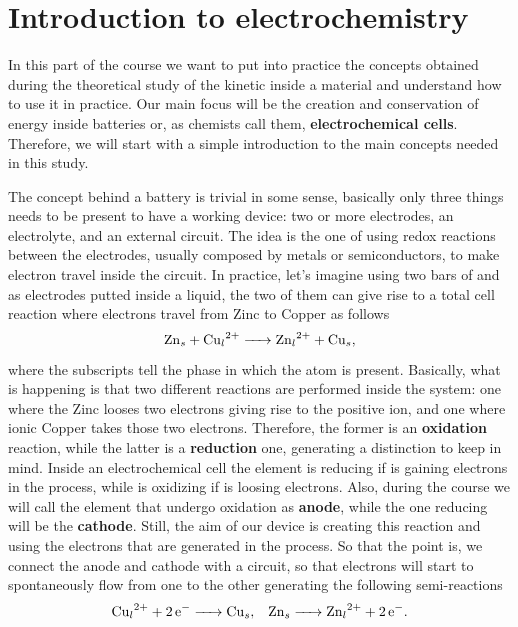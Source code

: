 \section{Introduction to electrochemistry}

In this part of the course we want to put into practice the concepts obtained during the theoretical study of the kinetic inside a material and understand how to use it in practice. Our main focus will be the creation and conservation of energy inside batteries or, as chemists call them, \textbf{electrochemical cells}. Therefore, we will start with a simple introduction to the main concepts needed in this study.

The concept behind a battery is trivial in some sense, basically only three things needs to be present to have a working device: two or more electrodes, an electrolyte, and an external circuit. The idea is the one of using redox reactions between the electrodes, usually composed by metals or semiconductors, to make electron travel inside the circuit. In practice, let's imagine using two bars of  and  as electrodes putted inside a liquid, the two of them can give rise to a total cell reaction where electrons travel from Zinc to Copper as follows
\begin{equation}
    \ce{Zn_s + Cu_l^{2+} -> Zn_l^{2+} + Cu_s},
\end{equation}
where the subscripts tell the phase in which the atom is present. Basically, what is happening is that two different reactions are performed inside the system: one where the Zinc looses two electrons giving rise to the positive ion, and one where ionic Copper takes those two electrons. Therefore, the former is an \textbf{oxidation} reaction, while the latter is a \textbf{reduction} one, generating a distinction to keep in mind.
{
    Inside an electrochemical cell the element is reducing if is gaining electrons in the process, while is oxidizing if is loosing electrons.
}
\noindent
Also, during the course we will call the element that undergo oxidation as \textbf{anode}, while the one reducing will be the \textbf{cathode}. Still, the aim of our device is creating this reaction and using the electrons that are generated in the process. So that the point is, we connect the anode and cathode with a circuit, so that electrons will start to spontaneously flow from one to the other generating the following semi-reactions
\begin{align}
    &\ce{Cu_l^{2+} + 2e^- -> Cu_s}, &\ce{Zn_s -> Zn_l^{2+} + 2e^-}.
\end{align}
